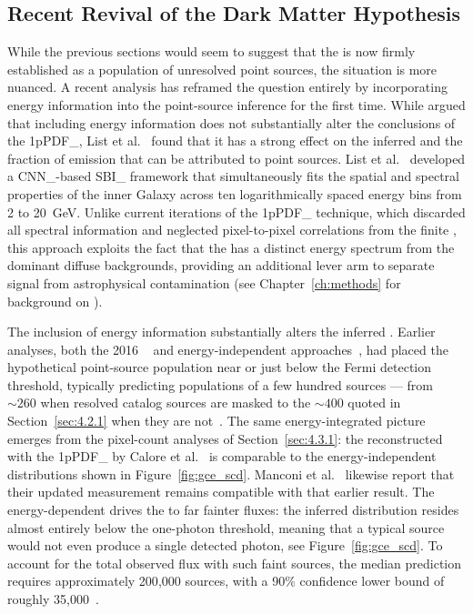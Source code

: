 \subsection{Recent Revival of the Dark Matter Hypothesis}
\label{sec:4.3.3}
While the previous sections would seem to suggest that the \GCE is now firmly established as a population of unresolved point sources, the situation is more nuanced.
A recent analysis has reframed the question entirely by incorporating energy information into the point-source inference for the first time.
While \cite{Manconi:2025ogr} argued that including energy information does not substantially alter the conclusions of the \gls{1pPDF_}, List et al.~\cite{List:2025qbx} found that it has a strong effect on the inferred \SCD and the fraction of emission that can be attributed to point sources.
List et al.~\cite{List:2025qbx} developed a \gls{CNN_}-based \gls{SBI_} framework that simultaneously fits the spatial and spectral properties of the inner Galaxy across ten logarithmically spaced energy bins from 2 to 20~GeV.
Unlike current iterations of the \gls{1pPDF_} technique, which discarded all spectral information and neglected pixel-to-pixel correlations from the finite \PSF, this approach exploits the fact that the \GCE has a distinct energy spectrum from the dominant diffuse backgrounds, providing an additional lever arm to separate signal from astrophysical contamination (see Chapter~\ref{ch:methods} for background on \SBI).

The inclusion of energy information substantially alters the inferred \SCD.
Earlier analyses, both the 2016 \NPTF~\cite{Lee:2015fea} and energy-independent \CNN approaches~\cite{Caron:2017udl, List:2020mzd}, had placed the hypothetical point-source population near or just below the Fermi detection threshold, typically predicting populations of a few hundred sources --- from $\sim 260$ when resolved catalog sources are masked to the $\sim 400$ quoted in Section~\ref{sec:4.2.1} when they are not~\cite{Lee:2015fea}.
The same energy-integrated picture emerges from the pixel-count analyses of Section~\ref{sec:4.3.1}: the \SCD reconstructed with the \gls{1pPDF_} by Calore et al.~\cite{Calore_2021} is comparable to the energy-independent distributions shown in Figure~\ref{fig:gce_scd}. Manconi et al.~\cite{Manconi:2025ogr} likewise report that their updated measurement remains compatible with that earlier result.
The energy-dependent \CNN drives the \SCD to far fainter fluxes: the inferred distribution resides almost entirely below the one-photon threshold, meaning that a typical source would not even produce a single detected photon, see Figure~\ref{fig:gce_scd}.
To account for the total observed \GCE flux with such faint sources, the median prediction requires approximately 200{,}000 sources, with a 90\% confidence lower bound of roughly 35{,}000~\cite{List:2025qbx}.

